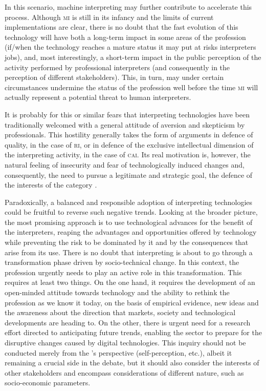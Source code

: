 \documentclass[output=paper]{langsci/langscibook}
\begin{document}
\largerpage 
In this scenario, machine interpreting may further contribute to accelerate this process. Although \textsc{mi} is still in its infancy and the limits of current implementations are clear, there is no doubt that the fast evolution of this technology will have both a long-term impact in some areas of the profession (if/when the technology reaches a mature status it may put at risks interpreters jobs), and, most interestingly, a short-term impact in the public perception of the activity performed by professional interpreters (and consequently in the perception of different stakeholders). This, in turn, may under certain circumstances undermine the status of the profession well before the time  \textsc{mi} will actually represent a potential threat to human interpreters. 

It is probably for this or similar fears that interpreting technologies have been traditionally welcomed with a general attitude of aversion and skepticism by professionals. This hostility generally takes the form of arguments in defence of quality, in the case of \textsc{ri}, or in defence of the exclusive intellectual dimension of the interpreting activity, in the case of \textsc{cai}. Its real motivation is, however, the natural feeling of insecurity and fear of technologically induced changes and, consequently, the need to pursue a legitimate and strategic goal, the defence of the interests of the category \citep{pym_what_2011}. 
 
Paradoxically, a balanced and responsible adoption of interpreting technologies could be fruitful to reverse such negative trends. Looking at the broader picture, the most promising approach is to use technological advances for the benefit of the interpreters, reaping the advantages and opportunities offered by technology while preventing the risk to be dominated by it and by the consequences that arise from its use. There is no doubt that interpreting is about to go through a transformation phase driven by socio-technical change. In this context, the profession urgently needs to play an active role in this transformation. This requires at least two things. On the one hand, it requires the development of an open-minded attitude towards technology and the ability to rethink the profession as we know it today, on the basis of empirical evidence, new ideas and the awareness about the direction that markets, society and technological developments are heading to. On the other, there is urgent need for a research effort directed to anticipating future trends, enabling the sector to prepare for the disruptive changes caused by digital technologies. This inquiry should not be conducted merely from the ’s perspective (self-perception, etc.), albeit it remaining a crucial side in the debate, but it should also consider the interests of other stakeholders and encompass considerations of different nature, such as socio-economic parameters. 
\end{document}

